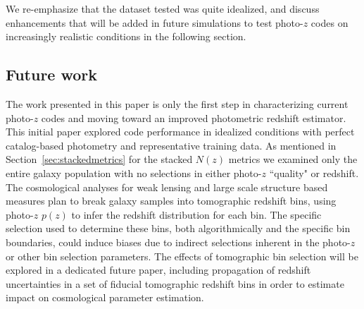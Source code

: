 We re-emphasize that the dataset tested was quite idealized, and discuss enhancements that will be added in future simulations to test photo-$z$ codes on increasingly realistic conditions in the following section.

\subsection{Future work}
\label{sec:futurework}
The work presented in this paper is only the first step in characterizing current photo-$z$ codes and moving toward an improved photometric redshift estimator.  This initial paper explored code performance in idealized conditions with perfect catalog-based photometry and representative training data.  As mentioned in Section~\ref{sec:stackedmetrics} for the stacked $N(z)$ metrics we examined only the entire galaxy population with no selections in either photo-$z$ ``quality" or redshift.  The cosmological analyses for weak lensing and large scale structure based measures plan to break galaxy samples into tomographic redshift bins, using photo-$z$ $p(z)$ to infer the redshift distribution for each bin.  The specific selection used to determine these bins, both algorithmically and the specific bin boundaries, could induce biases due to indirect selections inherent in the photo-$z$ or other bin selection parameters.  The effects of tomographic bin selection will be explored in a dedicated future paper, including propagation of redshift uncertainties in a set of fiducial tomographic redshift bins in order to estimate impact on cosmological parameter estimation.


